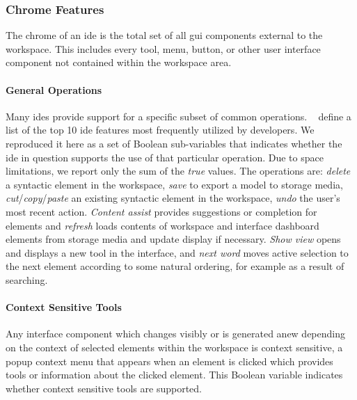 \subsubsection{Chrome Features} \label{subsubsec:chrome}

The chrome of an \ac{ide} is the total set of all \acf{gui} components
external to the workspace. This includes every tool, menu, button, or other
user interface component not contained within the workspace area.


\paragraph{General Operations}
Many \acp{ide} provide support for a specific subset of common operations.
\citeauthor{murphy2006}~\cite{murphy2006} define a list of the top 10 \ac{ide} features most frequently utilized by developers.
We reproduced it here as a set of Boolean sub-variables that indicates whether the \ac{ide} in question supports the use of that particular operation.
Due to space limitations, we report only the sum of the \textsl{true} values.
The operations are: \emph{delete} a syntactic element in the workspace,
\emph{save} to export a model to storage media,
\emph{cut}/\emph{copy}/\emph{paste} an existing syntactic element in the workspace,
\emph{undo} the user's most recent action.
\emph{Content assist} provides suggestions or completion for elements
and
\emph{refresh} loads contents of workspace and interface dashboard elements from storage media and update display if necessary.
\emph{Show view} opens and displays a new tool in the interface,
and
\emph{next word} moves active selection to the next element according to some natural ordering, for example as a result of searching.


\paragraph{Context Sensitive Tools}
Any interface component which changes visibly or is generated anew
depending on the context of selected elements within the workspace is
context sensitive, \eg a popup context menu that appears when an element is
clicked which provides tools or information about the clicked element.
This Boolean variable indicates whether context sensitive tools are
supported.


